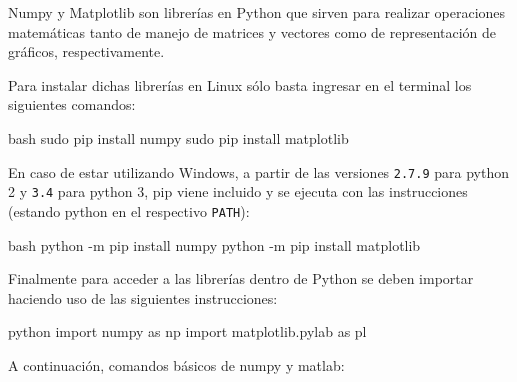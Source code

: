\documentclass[letterpaper,11pt]{article} %
\begin{document}



Numpy y Matplotlib son librerías en Python que sirven para realizar operaciones matemáticas tanto de manejo de matrices y vectores como de representación de gráficos, respectivamente.

\newp Para instalar dichas librerías en Linux sólo basta ingresar en el terminal los siguientes comandos:

\begin{sourcecode}{bash}{}
sudo pip install numpy
sudo pip install matplotlib
\end{sourcecode}

\newp En caso de estar utilizando Windows, a partir de las versiones \texttt{2.7.9} para python 2 y \texttt{3.4} para python 3, pip viene incluido y se ejecuta con las instrucciones (estando python en el respectivo \texttt{PATH}):

\begin{sourcecode}{bash}{}
python -m pip install numpy
python -m pip install matplotlib
\end{sourcecode}

\newp Finalmente para acceder a las librerías dentro de Python se deben importar haciendo uso de las siguientes instrucciones:

\begin{sourcecode}{python}{}
import numpy as np
import matplotlib.pylab as pl
\end{sourcecode}

\newp A continuación, comandos básicos de numpy y matlab:
\end{document}
